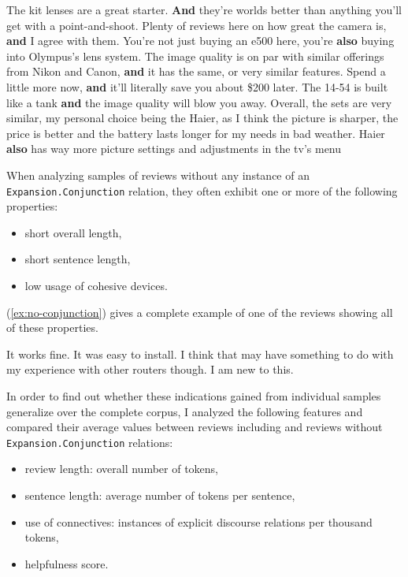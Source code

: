\documentclass[
    a4paper,%
    12pt,%
    oneside,%
    toc=bibliography,
    final,
]{scrartcl}
\begin{document}
\begin{exe}
\ex \label{ex:conjunction-first} The kit lenses are a great starter. \textbf{And} they're worlds better than anything you'll get with a point-and-shoot.
\ex Plenty of reviews here on how great the camera is, \textbf{and} I agree with them.
\ex You're not just buying an e500 here, you're \textbf{also} buying into Olympus's lens system.
\ex The image quality is on par with similar offerings from Nikon and Canon, \textbf{and} it has the same, or very similar features.
\ex Spend a little more now, \textbf{and} it'll literally save you about \$200 later.
\ex The 14-54 is built like a tank \textbf{and} the image quality will blow you away.
\ex \label{ex:conjunction-last} Overall, the sets are very similar, my personal choice being the Haier, as I think the picture is sharper, the price is better and the battery lasts longer for my needs in bad weather. Haier \textbf{also} has way more picture settings and adjustments in the tv's menu
\end{exe}

When analyzing samples of reviews without any instance of an \lstinline|Expansion.Conjunction| relation, they often exhibit one or more of the following properties:

\begin{itemize}
\item short overall length,
\item short sentence length,
\item low usage of cohesive devices.
\end{itemize}

(\ref{ex:no-conjunction}) gives a complete example of one of the reviews showing all of these properties.

\begin{exe}
\ex \label{ex:no-conjunction} It works fine.  It was easy to install.  I think that may have something to do with my experience with other routers though.  I am new to this.
\end{exe}

In order to find out whether these indications gained from individual samples generalize over the complete corpus, I analyzed the following features and compared their average values between reviews including and reviews without \lstinline|Expansion.Conjunction| relations:

\begin{itemize}
\item review length: overall number of tokens,
\item sentence length: average number of tokens per sentence,
\item use of connectives: instances of explicit discourse relations per thousand tokens,
\item helpfulness score.
\end{itemize}
\end{document}
